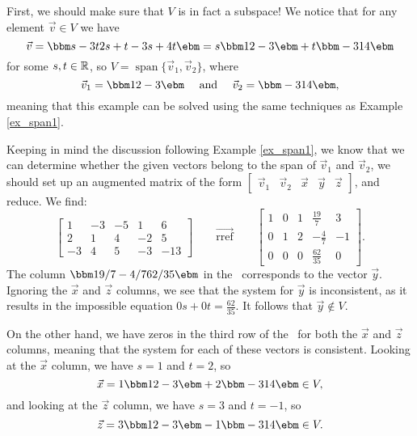 {First, we should make sure that $V$ is in fact a subspace! We notice that for any element $\vec v\in V$ we have
\[
\vec v = \bbm s-3t\\2s+t\\-3s+4t\ebm = s\bbm 1\\2\\-3\ebm + t\bbm -3\\1\\4\ebm
\]
for some $s,t\in\mathbb{R}$, so $V = \operatorname{span}\{\vec{v}_1,\vec{v}_2\}$, where
\[
\vec{v}_1 = \bbm 1\\2\\-3\ebm \quad \text{ and } \quad \vec{v}_2=\bbm -3\\1\\4\ebm,
\]
meaning that this example can be solved using the same techniques as Example \ref{ex_span1}.

Keeping in mind the discussion following Example \ref{ex_span1}, we know that we can determine whether the given vectors belong to the span of $\vec{v}_1$ and $\vec{v}_2$, we should set up an augmented matrix of the form $[\begin{array}{cc|c|c|c} \vec{v}_1 & \vec{v}_2 & \vec x & \vec y & \vec z\end{array}]$, and reduce. We find:
\[
\left[\begin{array}{cc|c|c|c}
1&-3&-5&1&6\\
2&1&4&-2&5\\
-3&4&5&-3&-13
\end{array}\right]\qquad \overrightarrow{\text{rref}}\qquad
\left[\begin{array}{cc|c|c|c}
1&0&1&\frac{19}{7}&3\\[3pt]
0&1&2&-\frac{4}{7}&-1\\[3pt]
0&0&0&\frac{62}{35}&0
\end{array}\right].
\]
The column $\bbm 19/7\\-4/7\\62/35\ebm$ in the \rref\ corresponds to the vector $\vec y$. Ignoring the $\vec x$ and $\vec z$ columns, we see that the system for $\vec y$ is inconsistent, as it results in the impossible equation $0s+0t = \frac{62}{35}$. It follows that $\vec y\notin V$. 

On the other hand, we have zeros in the third row of the \rref\ for both the $\vec x$ and $\vec z$ columns, meaning that the system for each of these vectors is consistent. Looking at the $\vec x$ column, we have $s=1$ and $t=2$, so
\[
\vec x = 1\bbm 1\\2\\-3\ebm +2\bbm -3\\1\\4\ebm \in V,
\]
and looking at the $\vec z$ column, we have $s=3$ and $t=-1$, so
\[
\vec z = 3\bbm 1\\2\\-3\ebm -1\bbm -3\\1\\4\ebm \in V.
\]

\baselineskip
}

